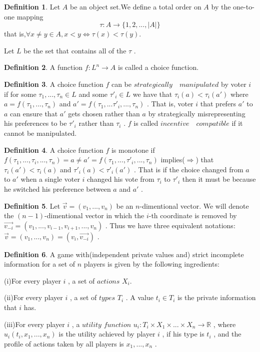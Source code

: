 \documentclass[10pt,reqno]{amsart}
\theoremstyle{definition}
\newtheorem{defn}{Definition}[section]
\theoremstyle{remark}
\numberwithin{equation}{section}
\begin{document}
\begin{defn}
Let $A$ be an object set.We define a total order on $A$ by the one-to-one mapping
$$\tau:A\rightarrow \{1,2,...,|A|\}$$
that is,$\forall x\not=y\in A,x<y\Leftrightarrow \tau(x)<\tau(y)$.

Let $L$ be the set that contains all of the $\tau$ .
\end{defn}

\begin{defn}
A function $f:L^n\rightarrow A$ is called a choice function.
\end{defn}

\begin{defn}
A choice function $f$ can be $strategically\quad manipulated$ by voter $i$ if for some $\tau_1,...,\tau_n\in L$ and some $\tau'_i\in L$ we have that $\tau_i(a)<\tau_i(a')$ where $a=f(\tau_1,...,\tau_n)$ and $a'=f(\tau_1,...\tau'_i,...,\tau_n)$ . That is, voter $i$ that prefers $a'$ to $a$ can ensure that $a'$ gets chosen rather than $a$ by strategically misrepresenting his preferences to be $\tau'_i$ rather than $\tau_i$ . $f$ is called $incentive\quad compatible$ if it cannot be manipulated.
\end{defn}

\begin{defn}
A choice function $f$ is monotone if $f(\tau_1,...,\tau_i,...,\tau_n)=a\not=a'=f(\tau_1,...,\tau'_i,...,\tau_n)$ implies($\Rightarrow$) that $\tau_i(a')<\tau_i(a)$ and $\tau'_i(a)<\tau'_i(a')$ . That is if the choice changed from $a$ to $a'$ when a single voter $i$ changed his vote from $\tau_i$ to $\tau'_i$ then it must be because he switched his preference between $a$ and $a'$ .
\end{defn}


\begin{defn}
Let $\vec{v}=(v_1,...,v_n)$ be an $n$-dimentional vector. We will denote the $(n-1)$-dimentional vector in which the $i$-th coordinate is removed by $\vec{v_{-i}}=(v_1,...,v_{i-1},v_{i+1},...,v_n)$ . Thus we have three equivalent notations:$\vec{v}=(v_1,...,v_n)=(v_i,\vec{v_{-i}})$ .
\end{defn}

\begin{defn}
A game with(independent private values and) strict incomplete information for a set of $n$ players is given by the following ingredients:

(i)For every player $i$ , a set of $actions$ $X_i$.

(ii)For every player $i$ , a set of $types$ $T_i$ . A value $t_i\in T_i$ is the private information that $i$ has.

(iii)For every player $i$ , a $utility$ $function$ $u_i:T_i\times X_1\times ...\times X_n\rightarrow \mathbb{R}$ , where $u_i(t_i,x_1,...,x_n)$ is the utility achieved by player $i$ , if his type is $t_i$ , and the profile of actions taken by all players is $x_1,...,x_n$ . 
\end{defn}
\end{document}

